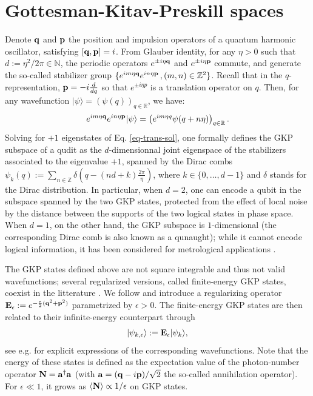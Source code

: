 \documentclass[a4paper, 11pt]{article}
\newcommand{\oE}{{\bf E}}
\newcommand{\oN}{{\bf N}}
\newcommand{\oq}{{\bf q}}
\newcommand{\op}{{\bf p}}
\newcommand{\oa}{{\bf a}}
\begin{document}
\section{Gottesman-Kitav-Preskill spaces}
\label{sec-defs}
Denote $\oq$ and $\op$ the position and impulsion operators of a quantum harmonic oscillator, satisfying $[\oq, \op] = i$.
From Glauber identity, for any $\eta>0$ such that $d := \eta^2/ 2\pi \in \mathbb N$, the periodic operators $e^{\pm i\eta \oq}$ and $e^{\pm i\eta \op}$ commute, and generate the so-called stabilizer group $\{ e^{i m \eta \oq} e^{i n \eta \op}\, , (m,n) \in \mathbb Z^2\}$.
Recall that in the $q$-representation, $\op = -i \frac{d}{dq}$ so that $e^{\pm i\eta p}$ is a translation operator on $q$. Then, for any wavefunction $|\psi\rangle = (\psi(q))_{q\in\mathbb R}$, we have:
\begin{equation}
    e^{ im \eta \oq} e^{i n \eta \op} |\psi\rangle =
    \left( e^{i m \eta q} \psi(q+n\eta) \right)_{q\in\mathbb R}.
    \label{eq-trans-sol}
\end{equation}
Solving for $+1$ eigenstates of Eq. \eqref{eq-trans-sol}, one formally defines the GKP subspace of a qudit as the $d$-dimensionnal joint eigenspace of the stabilizers associated to the eigenvalue $+1$, spanned by the Dirac combs
$\psi_k(q) := \sum_{n\in\mathbb Z} \delta(q-(nd+k)\frac{2\pi}\eta)$,
where $k\in \{0,\ldots,d-1\}$ and $\delta$ stands for the Dirac distribution.
In particular, when $d=2$, one can encode a qubit in the subspace spanned by the two GKP states, protected from the effect of local noise by the distance between the supports of the two logical states in phase space.
When $d=1$, on the other hand, the GKP subspace is $1$-dimensional (the corresponding Dirac comb is also known as a qunaught); while it cannot encode logical information, it has been considered for metrological applications
\cite{Duivenvoorden2017,valahuQuantumenhancedMultiparameterSensing2025,labarcaQuantumSensingDisplacements2026}.

The GKP states defined above are not square integrable and thus not valid wavefunctions; several regularized versions, called finite-energy GKP states, coexist in the litterature \cite{matsuura2020equivalence}. We follow \cite{gottesmanEncodingQubitOscillator2001} and introduce a regularizing operator $\oE_\epsilon := e^{-\frac\epsilon2(\oq^2+\op^2)}$ parametrized by $\epsilon>0$. The finite-energy GKP states are then related to their infinite-energy counterpart through
\begin{equation}
    |\psi_{k,\epsilon}\rangle := \oE_\epsilon |\psi_k\rangle,
\end{equation}
see e.g. \cite{sellemExponentialConvergenceDissipative2022a} for explicit expressions of the corresponding wavefunctions.
Note that the energy of these states is defined as the expectation value of the photon-number operator $\oN = \oa^\dagger \oa$ (with $\oa = (\oq - i\op)/\sqrt2$ the so-called annihilation operator). For $\epsilon \ll 1$, it grows as $\langle \oN \rangle \propto 1/\epsilon$ on GKP states.
\end{document}
